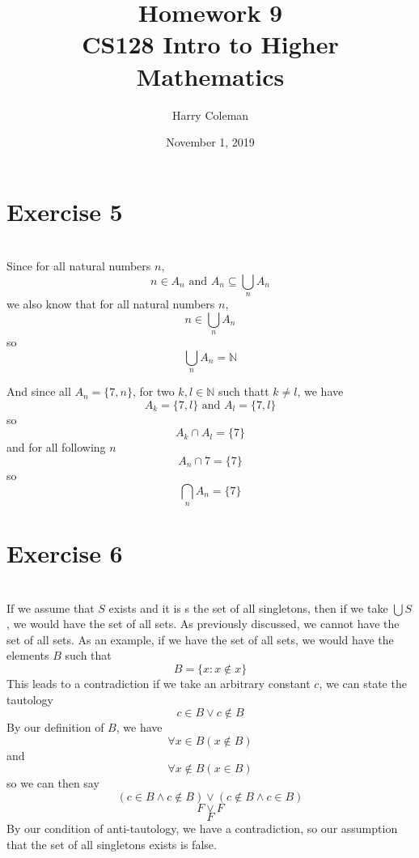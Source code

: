 \documentclass[11pt]{article}
\newcommand{\N}{\mathbb{N}}
\begin{document}
 
\title{Homework 9\\
    \large CS128 Intro to Higher Mathematics}
\author{Harry Coleman}
\date{November 1, 2019}

\maketitle

\section*{Exercise 5}
\\

Since for all natural numbers $n$,
\[n\in A_n \text{ and } A_n \subseteq \bigcup_n A_n\]
we also know that for all natural numbers $n$,
\[n \in \bigcup_n A_n\]
so
\[\bigcup_n A_n = \N\]

And since all $A_n=\{7,n\}$, for two $k,l\in\N$ such thatt $k\ne l$, we have
\[A_k = \{7,l\} \text{ and } A_l = \{7, l\}\]
so
\[A_k \cap A_l = \{7\}\]
and for all following $n$
\[A_n \cap {7} = \{7\}\]
so
\[\bigcap_n A_n = \{7\}\]


\newpage
\section*{Exercise 6}
\\


If we assume that $S$ exists and it is s the set of all singletons, then if we take $\bigcup S$, we would have the set of all sets. As previously discussed, we cannot have the set of all sets. As an example, if we have the set of all sets, we would have the elements $B$ such that
\[B = \{x: x\notin x\}\]
This leads to a contradiction if we take an arbitrary constant $c$, we can state the tautology
\[c \in B \lor c\notin B\]
By our definition of $B$, we have
\[\forall x\in B(x\notin B)\]
and
\[\forall x\notin B(x\in B)\]
so we can then say
\[(c \in B \land c\notin B) \lor (c\notin B \land c\in B)\]
\[F \lor F\]
\[F\]
By our condition of anti-tautology, we have a contradiction, so our assumption that the set of all singletons exists is false.
\end{document}
